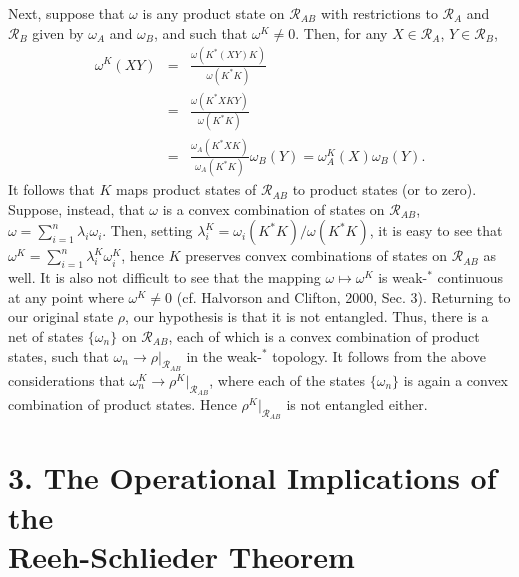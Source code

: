 \documentclass[12pt]{article}
\newcommand{\alg}[1]{\mbox{$\mathcal{#1}$}}
\begin{document}
Next, suppose that $\omega$ is any product state on 
$\alg{R}_{AB}$ with restrictions to $\alg{R}_{A}$ and 
$\alg{R}_{B}$ given by $\omega_{A}$ and $\omega_{B}$, and such that 
$\omega^{K}\not=0$.  Then, for any 
$X\in\alg{R}_{A}$, $Y\in\alg{R}_{B}$,
\begin{eqnarray}
 \omega^{K}(XY) & = & 
 \frac{\omega(K^{*}(XY)K)}{\omega(K^{*}K)} \\
 & = & \frac{\omega(K^{*}XKY)}{\omega(K^{*}K)} \\ 
 & = & \frac{\omega_{A}(K^{*}XK)}{\omega_{A}(K^{*}K)}\omega_{B}(Y)
 = \omega_{A}^{K}(X)\omega_{B}(Y).
 \end{eqnarray}
It follows that $K$ maps product states of $\alg{R}_{AB}$ to 
product states (or to zero).
Suppose, instead, that $\omega $ is a convex combination of states on 
$\alg{R}_{AB}$,
$\omega =\sum _{i=1}^{n}\lambda _{i}\omega _{i}$.  
Then, setting
$\lambda ^{K}_{i}= \omega _{i}(K^{*}K)/\omega (K^{*}K)$, it is 
easy to see that
$\omega ^{K}=\sum _{i=1}^{n}\lambda ^{K}_{i}\omega _{i}^{K}$,
hence $K$ preserves convex combinations of states on 
$\alg{R}_{AB}$ as well.  It is also not difficult to see that the mapping 
$\omega\mapsto\omega^{K}$ is weak-$^{*}$ continuous at any point where 
$\omega^{K}\not=0$  
 (cf. Halvorson and Clifton, 2000, Sec. 3).  
Returning to our original state $\rho$, our hypothesis is that it is 
 not 
entangled. Thus, there is a net 
of states 
$\{\omega_{n}\}$ on $\alg{R}_{AB}$, each of which is a convex combination of product states, 
such that 
$\omega_{n}\rightarrow \rho|_{\alg{R}_{AB}}$ in the weak-$^{*}$ 
topology.  It follows from the 
above considerations that 
$\omega_{n}^{K}\rightarrow \rho^{K}|_{\alg{R}_{AB}}$, where 
each of the states $\{\omega_{n}\}$ is again a convex combination of 
product states.  Hence $\rho^{K}|_{\alg{R}_{AB}}$ is not 
entangled either.

     \section*{3. The Operational Implications of the \\ Reeh-Schlieder 
      Theorem}   
       
\end{document}
